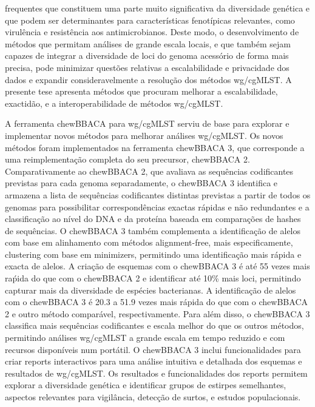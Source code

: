 frequentes que constituem uma parte muito significativa da diversidade genética e que podem ser determinantes para características fenotípicas relevantes, como virulência e resistência aos antimicrobianos. Deste modo, o desenvolvimento de métodos que permitam análises de grande escala locais, e que também sejam capazes de integrar a diversidade de loci do genoma acessório de forma mais precisa, pode minimizar questões relativas a escalabilidade e privacidade dos dados e expandir consideravelmente a resolução dos métodos wg/cgMLST. A presente tese apresenta métodos que procuram melhorar a escalabilidade, exactidão, e a interoperabilidade de métodos wg/cgMLST.

A ferramenta chewBBACA para wg/cgMLST serviu de base para explorar e implementar novos métodos para melhorar análises wg/cgMLST. Os novos métodos foram implementados na ferramenta chewBBACA 3, que corresponde a uma reimplementação completa do seu precursor, chewBBACA 2. Comparativamente ao chewBBACA 2, que avaliava as sequências codificantes previstas para cada genoma separadamente, o chewBBACA 3 identifica e armazena a lista de sequências codificantes distintas previstas a partir de todos os genomas para possibilitar correspondências exactas rápidas e não redundantes e a classificação ao nível do DNA e da proteína baseada em comparações de hashes de sequências. O chewBBACA 3 também complementa a identificação de alelos com base em alinhamento com métodos alignment-free, mais especificamente, clustering com base em minimizers, permitindo uma identificação mais rápida e exacta de alelos. A criação de esquemas com o chewBBACA 3 é até 55 vezes mais raṕida do que com o chewBBACA 2 e identificar até 10\% mais loci, permitindo capturar mais da diversidade de espécies bacterianas. A identificação de alelos com o chewBBACA 3 é 20.3 a 51.9 vezes mais rápida do que com o chewBBACA 2 e outro método comparável, respectivamente. Para além disso, o chewBBACA 3 classifica mais sequências codificantes e escala melhor do que os outros métodos, permitindo análises wg/cgMLST a grande escala em tempo reduzido e com recursos disponíveis num portátil. O chewBBACA 3 inclui funcionalidades para criar reports interactivos para uma análise intuitiva e detalhada dos esquemas e resultados de wg/cgMLST. Os resultados e funcionalidades dos reports permitem explorar a diversidade genética e identificar grupos de estirpes semelhantes, aspectos relevantes para vigilância, detecção de surtos, e estudos populacionais.


